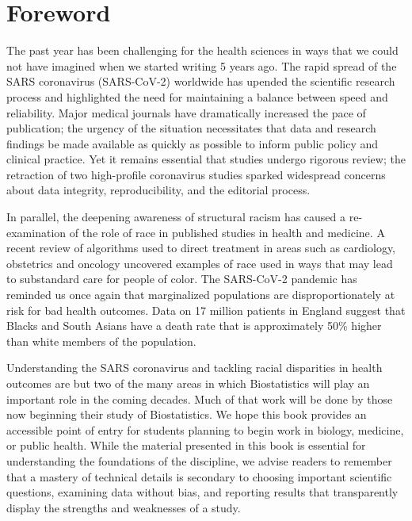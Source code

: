 \chapter*{Foreword}

The past year has been challenging for the health sciences in ways that we could not have imagined when we started writing 5 years ago. The rapid spread of the SARS coronavirus (SARS-CoV-2) worldwide has upended the scientific research process and highlighted the need for maintaining a balance between speed and reliability. Major medical journals have dramatically increased the pace of publication; the urgency of the situation necessitates that data and research findings be made available as quickly as possible to inform public policy and clinical practice. Yet it remains essential that studies undergo rigorous review; the retraction of two high-profile coronavirus studies 
sparked widespread concerns about data integrity, reproducibility, and the editorial process.

In parallel, the deepening awareness of structural racism has caused a re-examination of the role of race in published studies in health and medicine.  A recent review of algorithms used to direct treatment in areas such as cardiology, obstetrics and oncology uncovered examples of race used in ways that may lead to substandard care for people of color.  The SARS-CoV-2 pandemic has reminded us once again that marginalized populations are disproportionately at risk for bad health outcomes. Data on 17 million patients in England  suggest that Blacks and South Asians have a death rate that is approximately 50\% higher than white members of the population. 

Understanding the SARS coronavirus and tackling racial disparities in health outcomes are but two of the many areas in which Biostatistics will play an important role in the coming decades. Much of that work will be done by those now beginning their study of Biostatistics. We hope this book provides an accessible point of entry for students planning to begin work in biology, medicine, or public health. While the material presented in this book is essential for understanding the foundations of the discipline, we advise readers to remember that a mastery of technical details is secondary to choosing important scientific questions, examining data without bias, and reporting results that transparently display the strengths and weaknesses of a study.

